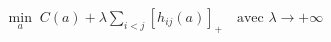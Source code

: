 \documentclass[preview]{standalone}
\begin{document}
\begin{align*}
\min_{a}\; C(a) +\lambda \sum_{i<j}[h_{ij}(a)]_+ \quad\text{avec }\lambda\to+\infty
\end{align*}
\end{document}
